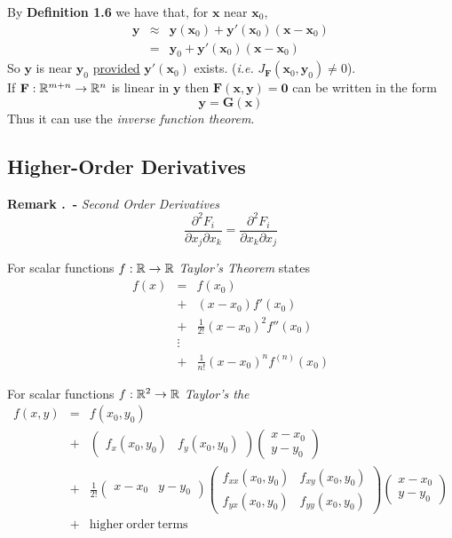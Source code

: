 \documentclass[11pt,a4paper]{article}
\begin{document}
By \textbf{Definition 1.6} we have that, for $\textbf{x}$ near $\textbf{x}_0$,
\[\begin{array}{rcl}
\textbf{y} &\approx& \textbf{y}(\textbf{x}_0)+\textbf{y}'(\textbf{x}_0)(\textbf{x}-\textbf{x}_0)\\
&=&\textbf{y}_0+\textbf{y}'(\textbf{x}_0)(\textbf{x}-\textbf{x}_0)
\end{array}\]
So $\textbf{y}$ is near $\textbf{y}_0$ \underline{provided} $\textbf{y}'(\textbf{x}_0)$ exists. (\textit{i.e.} $J_{\textbf{F}}(\textbf{x}_0, \textbf{y}_0)\neq0$).\\

If $\textbf{F} : \mathbb{R}^{m+n} \to \mathbb{R}^n$ is linear in $\textbf{y}$ then $\textbf{F}(\textbf{x},\textbf{y})=\textbf{0}$ can be written in the form
$$\textbf{y} = \textbf{G}(\textbf{x})$$
Thus it can use the \textit{inverse function theorem}.

\subsection{Higher-Order Derivatives}

 \textbf{Remark .\ - }\textit{Second Order Derivatives}
$$\frac{\partial^2 F_i}{\partial x_j \partial x_k} = \frac{\partial^2 F_i}{\partial x_k \partial x_j}$$

For scalar functions $f : \mathbb{R} \to \mathbb{R}$ \textit{Taylor's Theorem} states
\[\begin{array}{rcl}
f(x)&=&f(x_0)\\
&+&(x-x_0)f'(x_0)\\
&+&\frac{1}{2!}(x-x_0)^2f''(x_0)\\
&\vdots&\\
&+&\frac{1}{n!}(x-x_0)^nf^{(n)}(x_0)
\end{array}\]

For scalar functions $f : \mathbb{R}^2 \to \mathbb{R}$ \textit{Taylor's the}
\[\begin{array}{rcl}
f(x,y) &=& f(x_0, y_0)\\
&+&\begin{pmatrix}f_x(x_0, y_0) & f_y(x_0, y_0)\end{pmatrix}\begin{pmatrix}x-x_0 \\ y-y_0\end{pmatrix}\\
&+&\frac{1}{2!}\begin{pmatrix}x-x_0 & y-y_0\end{pmatrix}\begin{pmatrix}f_{xx}(x_0, y_0) & f_{xy}(x_0,y_0)\\f_{yx}(x_0,y_0) &f_{yy}(x_0, y_0)\end{pmatrix}\begin{pmatrix}x-x_0 \\ y-y_0\end{pmatrix}\\
&+&\mathrm{higher\ order\ terms}
\end{array}\]
\end{document}
